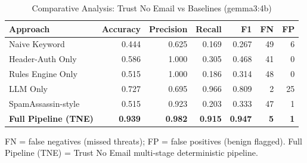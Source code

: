\begin{table}[h]
\centering
\caption{Comparative Analysis: Trust No Email vs Baselines (gemma3:4b)}
\label{tab:e10_comparative}
\begin{tabular}{l r r r r r r}
\hline
Approach & Accuracy & Precision & Recall & F1 & FN & FP \\
\hline
Naive Keyword & 0.444 & 0.625 & 0.169 & 0.267 & 49 & 6 \\
Header-Auth Only & 0.586 & 1.000 & 0.305 & 0.468 & 41 & 0 \\
Rules Engine Only & 0.515 & 1.000 & 0.186 & 0.314 & 48 & 0 \\
LLM Only & 0.727 & 0.695 & 0.966 & 0.809 & 2 & 25 \\
SpamAssassin-style & 0.515 & 0.923 & 0.203 & 0.333 & 47 & 1 \\
\textbf{Full Pipeline (TNE)} & \textbf{0.939} & \textbf{0.982} & \textbf{0.915} & \textbf{0.947} & \textbf{5} & \textbf{1} \\
\hline
\end{tabular}
\vspace{2mm}
\footnotesize{FN = false negatives (missed threats); FP = false positives (benign flagged). Full Pipeline (TNE) = Trust No Email multi-stage deterministic pipeline.}
\end{table}